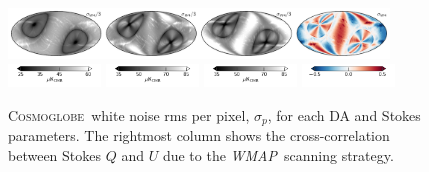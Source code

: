 \documentclass[twocolumn]{../../common/aa}
\def\WMAP{\emph{WMAP}}
\newcommand{\cosmoglobe}{\textsc{Cosmoglobe}}
\begin{document}
\begin{figure}[p]
	\includegraphics[width=0.9\textwidth]{figures/090-WMAP_W4_rms.pdf}
	\includegraphics[width=0.22\textwidth]{figures/cbar_rms_I.pdf}
	\includegraphics[width=0.22\textwidth]{figures/cbar_rms_P.pdf}
	\includegraphics[width=0.22\textwidth]{figures/cbar_rms_P.pdf}
	\includegraphics[width=0.22\textwidth]{figures/cbar_rho.pdf}
	\caption{\cosmoglobe\ white noise rms per pixel, $\sigma_p$, for each DA and Stokes parameters. The rightmost column shows the cross-correlation between Stokes $Q$ and $U$ due to the \WMAP\ scanning strategy. }
        \label{fig:rms}
\end{figure}
\end{document}
